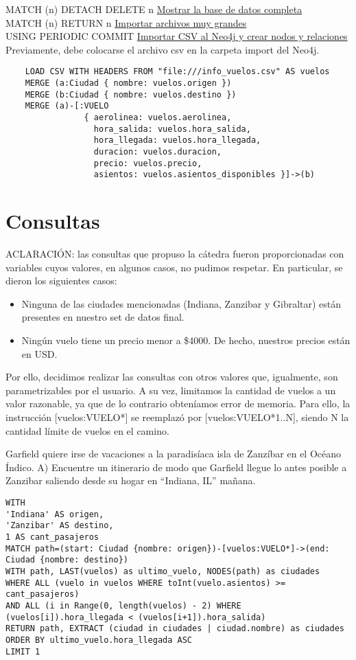 \documentclass[a4paper,11pt]{article}
\begin{document}
MATCH (n) DETACH DELETE n
\bigbreak
\underline{Mostrar la base de datos completa}\\

MATCH (n) RETURN n
\bigbreak
\underline{Importar archivos muy grandes}\\

USING PERIODIC COMMIT
\bigbreak
\underline{Importar CSV al Neo4j y crear nodos y relaciones}\\

Previamente, debe colocarse el archivo csv en la carpeta import del Neo4j.
\begin{verbatim}
	LOAD CSV WITH HEADERS FROM "file:///info_vuelos.csv" AS vuelos
	MERGE (a:Ciudad { nombre: vuelos.origen })
	MERGE (b:Ciudad { nombre: vuelos.destino })
	MERGE (a)-[:VUELO
				{ aerolinea: vuelos.aerolinea,
				  hora_salida: vuelos.hora_salida,
				  hora_llegada: vuelos.hora_llegada,
				  duracion: vuelos.duracion,
				  precio: vuelos.precio,
				  asientos: vuelos.asientos_disponibles }]->(b)
\end{verbatim}

\newpage
\section*{Consultas}
ACLARACIÓN: las consultas que propuso la cátedra fueron proporcionadas con variables cuyos valores, en algunos casos, no pudimos respetar. En particular, se dieron los siguientes casos:
\begin{itemize}
\item Ninguna de las ciudades mencionadas (Indiana, Zanzibar y Gibraltar) están presentes en nuestro set de datos final.
\item Ningún vuelo tiene un precio menor a \$4000. De hecho, nuestros precios están en USD.
\end{itemize}
    
Por ello, decidimos realizar las consultas con otros valores que, igualmente, son parametrizables por el usuario.
A su vez, limitamos la cantidad de vuelos a un valor razonable, ya que de lo contrario obteníamos error de memoria.
Para ello, la instrucción [vuelos:VUELO*] se reemplazó por [vuelos:VUELO*1..N], siendo N la cantidad límite de vuelos en el camino.

Garfield quiere irse de vacaciones a la paradisíaca isla de Zanzíbar en el Océano Índico.
A) Encuentre un itinerario de modo que Garfield llegue lo antes posible a Zanzibar saliendo desde su hogar en “Indiana, IL” mañana.
\begin{verbatim}
WITH
'Indiana' AS origen,
'Zanzibar' AS destino,
1 AS cant_pasajeros
MATCH path=(start: Ciudad {nombre: origen})-[vuelos:VUELO*]->(end:
Ciudad {nombre: destino})
WITH path, LAST(vuelos) as ultimo_vuelo, NODES(path) as ciudades
WHERE ALL (vuelo in vuelos WHERE toInt(vuelo.asientos) >=
cant_pasajeros)
AND ALL (i in Range(0, length(vuelos) - 2) WHERE 
(vuelos[i]).hora_llegada < (vuelos[i+1]).hora_salida)
RETURN path, EXTRACT (ciudad in ciudades | ciudad.nombre) as ciudades
ORDER BY ultimo_vuelo.hora_llegada ASC
LIMIT 1
\end{verbatim}
\end{document}

